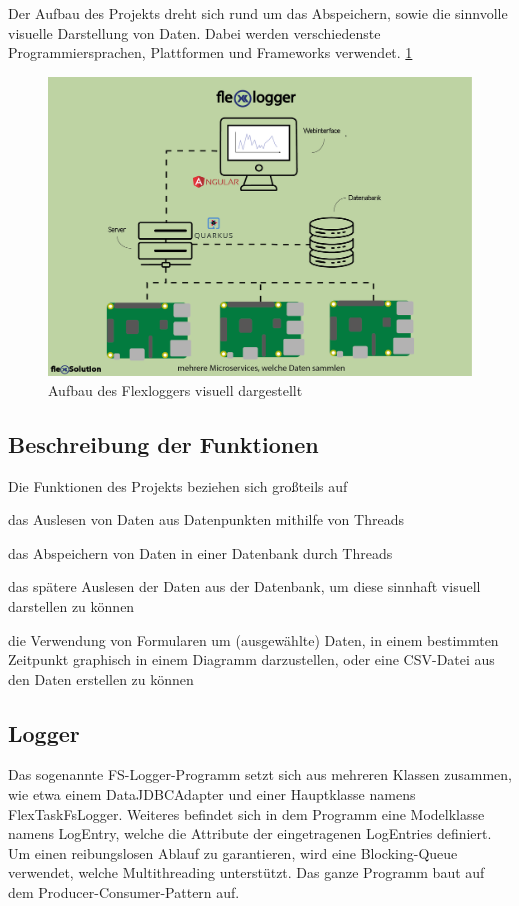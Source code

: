 
Der Aufbau des Projekts dreht sich rund um das Abspeichern, sowie die sinnvolle visuelle Darstellung von Daten. Dabei werden verschiedenste Programmiersprachen, Plattformen und Frameworks verwendet. \ref{fig:impl:FlexLoggerAufbau} 

\begin{figure}
    \centering
    \includegraphics[scale=0.7]{pics/webinterface.png}
    \caption{Aufbau des Flexloggers visuell dargestellt}
    \label{fig:impl:FlexLoggerAufbau}
\end{figure}

\subsection{Beschreibung der Funktionen}
Die Funktionen des Projekts beziehen sich großteils auf 
\begin{compactitem}
    \item das Auslesen von Daten aus Datenpunkten mithilfe von Threads
    \item das Abspeichern von Daten in einer Datenbank durch Threads
    \item das spätere Auslesen der Daten aus der Datenbank, um diese sinnhaft visuell darstellen zu können
    \item die Verwendung von Formularen um (ausgewählte) Daten, in einem bestimmten Zeitpunkt graphisch in einem Diagramm darzustellen, oder eine CSV-Datei aus den Daten erstellen zu können
\end{compactitem}


\subsection{Logger}
Das sogenannte FS-Logger-Programm setzt sich aus mehreren Klassen zusammen, wie etwa einem DataJDBCAdapter und einer Hauptklasse namens FlexTaskFsLogger. Weiteres befindet sich in dem Programm eine Modelklasse namens LogEntry, welche die Attribute der eingetragenen LogEntries definiert. Um einen reibungslosen Ablauf zu garantieren, wird eine Blocking-Queue verwendet, welche Multithreading unterstützt. Das ganze Programm baut auf dem Producer-Consumer-Pattern auf.          
 
